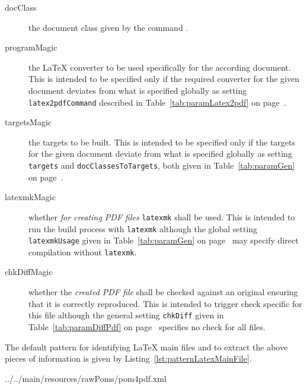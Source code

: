 \begin{description}
  \item[docClass]
  the document class given by the command . 
  \item[programMagic]
  the \LaTeX{} converter to be used 
  specifically for the according document. 
  This is intended to be specified only 
  if the required converter for the given document deviates 
  from what is specified 
  globally as setting \texttt{latex2pdfCommand} described in 
  Table~\ref{tab:paramLatex2pdf} on page~\pageref{tab:paramLatex2pdf}. 
  \item[targetsMagic]
  the targets to be built. 
  This is intended to be specified only 
  if the targets for the given document deviate from what is specified 
  globally as setting \texttt{targets} and \texttt{docClassesToTargets}, 
  both given in 
  Table~\ref{tab:paramGen} on page~\pageref{tab:paramGen}. 
  \item[latexmkMagic] 
  whether \emph{for creating PDF files} \texttt{latexmk} shall be used. 
  This is intended to run the build process with \texttt{latexmk} 
  although the global setting \texttt{latexmkUsage} 
  given in Table~\ref{tab:paramGen} on page~\pageref{tab:paramGen} 
  may specify direct compilation 
  without \texttt{latexmk}. 
  \item[chkDiffMagic]
  whether the \emph{created PDF file} shall be checked against an original 
  ensuring that it is correctly reproduced. 
  This is intended to trigger check specific for this file 
  although the general setting \texttt{chkDiff} 
  given in Table~\ref{tab:paramDiffPdf} on page~\pageref{tab:paramDiffPdf} 
  specifies no check for all files. 
\end{description}

The default pattern for identifying \LaTeX{} main files 
and to extract the above pieces of information 
is given by Listing~\ref{lst:patternLatexMainFile}. 



{../../main/resources/rawPoms/pom4pdf.xml}%

